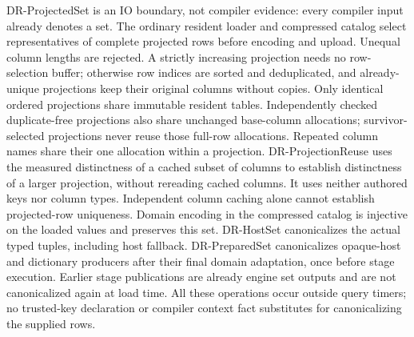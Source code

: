 DR-ProjectedSet is an IO boundary, not compiler evidence: every compiler input
already denotes a set. The ordinary resident loader and compressed catalog
select representatives of complete projected rows before encoding and upload.
Unequal column lengths are rejected. A strictly increasing projection needs no
row-selection buffer; otherwise row indices are sorted and deduplicated, and
already-unique projections keep their original columns without copies.
Only identical ordered projections share immutable resident tables. Independently
checked duplicate-free projections also share unchanged base-column allocations;
survivor-selected projections never reuse those full-row allocations. Repeated
column names share their one allocation within a projection. DR-ProjectionReuse
uses the measured distinctness of a cached subset of columns to establish
distinctness of a larger projection, without rereading cached columns. It
uses neither authored keys nor column types. Independent column caching alone
cannot establish projected-row uniqueness. Domain encoding in the compressed
catalog is injective on the loaded values and preserves this set.
DR-HostSet canonicalizes the actual typed tuples, including host fallback.
DR-PreparedSet canonicalizes opaque-host and dictionary producers after their
final domain adaptation, once before stage execution. Earlier stage publications
are already engine set outputs and are not canonicalized again at load time.
All these operations occur outside query timers; no trusted-key declaration or
compiler context fact substitutes for canonicalizing the supplied rows.

